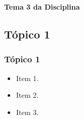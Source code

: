 {
  \begin{frame}[plain]%

    \vfill
    \centering

    \begin{block}{}
      \centering{}
      \Huge{\textbf{Tema 3 da Disciplina}}
    \end{block}

    \vfill

  \end{frame}
} %



\subsection[Tópico 1]{Tópico 1}\label{subsec:tema-3-topico1}



\begin{frame}[t]\frametitle{Tópico 1}

  \begin{itemize}
    \justifying{}
    \setlength\itemsep{1em}
    \item Item 1.
    \item Item 2.
    \item Item 3.
  \end{itemize}

\end{frame}



